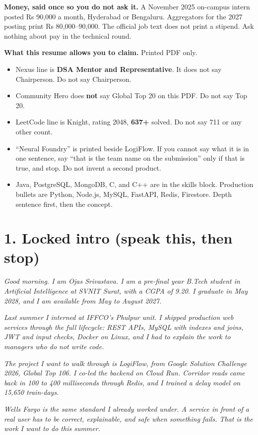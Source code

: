 \documentclass[a4paper,9.5pt]{extarticle}
\begin{document}
\textbf{Money, said once so you do not ask it.} A November 2025 on-campus intern posted Rs 90{,}000 a month, Hyderabad or Bengaluru. Aggregators for the 2027 posting print Rs 80{,}000--90{,}000. The official job text does not print a stipend. Ask nothing about pay in the technical round.

\textbf{What this resume allows you to claim.} Printed PDF only.
\begin{itemize}
  \item Nexus line is \textbf{DSA Mentor and Representative}. It does not say Chairperson. Do not say Chairperson.
  \item Community Hero does \textbf{not} say Global Top 20 on this PDF. Do not say Top 20.
  \item LeetCode line is Knight, rating 2048, \textbf{637+} solved. Do not say 711 or any other count.
  \item ``Neural Foundry'' is printed beside LogiFlow. If you cannot say what it is in one sentence, say ``that is the team name on the submission'' only if that is true, and stop. Do not invent a second product.
  \item Java, PostgreSQL, MongoDB, C, and C++ are in the skills block. Production bullets are Python, Node.js, MySQL, FastAPI, Redis, Firestore. Depth sentence first, then the concept.
\end{itemize}

\section{1. Locked intro (speak this, then stop)}
\textit{Good morning. I am Ojas Srivastava. I am a pre-final year B.Tech student in Artificial Intelligence at SVNIT Surat, with a CGPA of 9.20. I graduate in May 2028, and I am available from May to August 2027.}

\textit{Last summer I interned at IFFCO's Phulpur unit. I shipped production web services through the full lifecycle: REST APIs, MySQL with indexes and joins, JWT and input checks, Docker on Linux, and I had to explain the work to managers who do not write code.}

\textit{The project I want to walk through is LogiFlow, from Google Solution Challenge 2026, Global Top 106. I co-led the backend on Cloud Run. Corridor reads came back in 100 to 400 milliseconds through Redis, and I trained a delay model on 15{,}650 train-days.}

\textit{Wells Fargo is the same standard I already worked under. A service in front of a real user has to be correct, explainable, and safe when something fails. That is the work I want to do this summer.}
\end{document}
